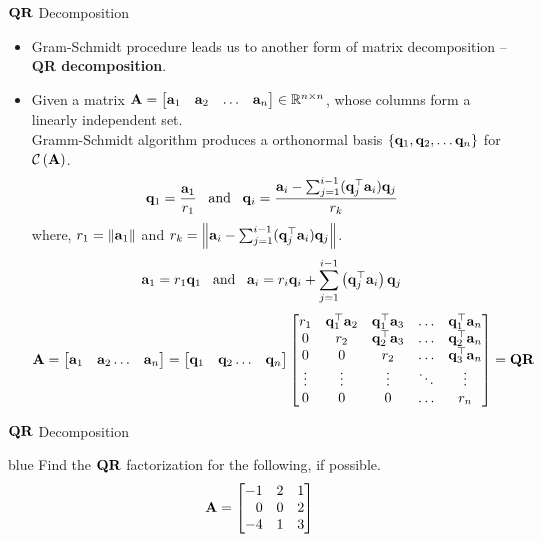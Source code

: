 \documentclass[aspectratio=169]{beamer}
\let\olditem\item
\renewcommand{\item}{\setlength{\itemsep}{\fill}\olditem}
\def\mf{\ensuremath\mathbf}
\def\mb{\ensuremath\mathbb}
\def\mc{\ensuremath\mathcal}
\def\lp{\ensuremath\left(}
\def\rp{\ensuremath\right)}
\begin{document}
\begin{frame}[t]{$\mf{QR}$ Decomposition}
\vspace{-0.25cm}
\begin{footnotesize}
\begin{itemize}
    \item Gram-Schmidt procedure leads us to another form of matrix  decomposition -- \textbf{QR decomposition}.
    \item Given a matrix $\mf{A} = \begin{bmatrix*}\mf{a}_1&\mf{a}_2&\ldots&\mf{a}_n\end{bmatrix*} \in \mb{R}^{n \times n}$, whose columns form a linearly independent set.\\
    Gramm-Schmidt algorithm produces a orthonormal basis $\left\{\mf{q}_1, \mf{q}_2, \ldots \mf{q}_n\right\}$ for $\mc{C}\lp \mf{A}\rp $.
    \[ \mf{q}_1 = \frac{\mf{a}_1}{r_1}\,\,\,\text{ and }\,\,\, \mf{q}_i = \frac{\mf{a}_i - \sum_{j=1}^{i-1}(\mf{q}_j^\top\mf{a}_i)\mf{q}_j}{r_k} \]
    where, $r_1 = \left\lVert \mf{a}_1\right\rVert$ and $r_k = \left\lVert \mf{a}_i - \sum_{j=1}^{i-1}(\mf{q}_j^\top\mf{a}_i)\mf{q}_j\right\rVert$.
    \[ \mf{a}_1 = r_1\mf{q}_1\,\,\,\text{ and }\,\,\,\mf{a}_i = r_i\mf{q}_i + \sum_{j=1}^{i-1}\lp \mf{q}_j^\top\mf{a}_i\rp \mf{q}_j\]
    \[ \mf{A} = \begin{bmatrix*}\mf{a}_1 & \mf{a}_2 \ldots & \mf{a}_n\end{bmatrix*} =  \begin{bmatrix*}\mf{q}_1 & \mf{q}_2 \ldots & \mf{q}_n\end{bmatrix*}
    \begin{bmatrix*}
    r_1 & \mf{q}_1^\top\mf{a}_2 & \mf{q}_1^\top\mf{a}_3 & \ldots & \mf{q}_1^\top\mf{a}_n\\
    0 & r_2 & \mf{q}_2^\top\mf{a}_3 & \ldots & \mf{q}_2^\top\mf{a}_n\\
    0 & 0 & r_2 & \ldots & \mf{q}_3^\top\mf{a}_n\\
    \vdots & \vdots & \vdots & \ddots & \vdots\\
    0 & 0 & 0 & \ldots & r_n\\\end{bmatrix*} = \mf{QR} \]
\end{itemize}
\end{footnotesize}
\end{frame}


\begin{frame}{$\mf{QR}$ Decomposition}

\begin{color}{blue}
Find the $\mf{QR}$ factorization for the following, if possible.
$$\mf{A} = \begin{bmatrix*}[r]
-1 & 2 & 1\\
 0 & 0 & 2\\
-4 & 1 & 3\\
\end{bmatrix*}$$
\end{color}

\end{frame}
\end{document}
